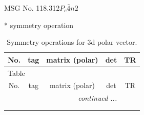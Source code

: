\documentclass[fleqn,8pt]{jsarticle}
\begin{document}
\setcounter{MaxMatrixCols}{32}

\renewcommand{\tablename}{Table~}
\renewcommand{\figurename}{Figure~}
\begin{center}
\LARGE
MSG No. 118.312\quad$P_{c}\bar{4}n2$
\end{center}
* symmetry operation
\renewcommand{\arraystretch}{1.3}
\begin{longtable}{ccccc}
\caption{Symmetry operations for 3d polar vector.}
 \\
 \hline \hline
No. & tag & matrix (polar) & det & TR \\ \hline \endfirsthead

\multicolumn{4}{l}{\tablename\ \thetable{}} \\
 \hline \hline
No. & tag & matrix (polar) & det & TR \\ \hline \endhead

 \hline \hline
\multicolumn{4}{r}{\footnotesize\it continued ...} \\ \endfoot

 \hline \hline
\multicolumn{4}{r}{} \\ \endlastfoot


\end{longtable}
\end{document}
